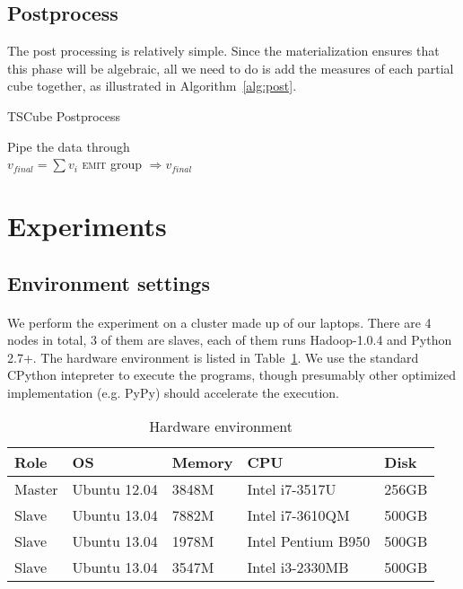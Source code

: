 \documentclass{article}
\begin{document}
\subsection{Postprocess}

The post processing is relatively simple. Since the materialization ensures that this phase will be algebraic, all we need to do is add the measures of each partial cube together, as illustrated in Algorithm~\ref{alg:post}.

\begin{algorithm}[h]
\centering
\caption{TSCube Postprocess}
\label{alg:post}
  \begin{algorithmic}[1]
      \State Pipe the data through
    \EndFunction
\\
      \State $v_{final} = \sum{v_{i}}$
      \State \textsc{emit} group $\Rightarrow v_{final}$
    \EndFunction
  \end{algorithmic}
\end{algorithm}

\section{Experiments}

\subsection{Environment settings}

\paragraph{}
We perform the experiment on a cluster made up of our laptops. There are 4 nodes in total, 3 of them are slaves, each of them runs Hadoop-1.0.4 and Python 2.7+. The hardware environment is listed in Table~\ref{table:env}. We use the standard CPython intepreter to execute the programs, though presumably other optimized implementation (e.g. PyPy) should accelerate the execution.

\begin{table}[h]
\centering
\begin{tabular}{l l l l l}
Role & OS & Memory & CPU & Disk \\
\hline
Master & Ubuntu 12.04 & 3848M & Intel i7-3517U & 256GB \\
Slave & Ubuntu 13.04  & 7882M & Intel i7-3610QM & 500GB \\
Slave & Ubuntu 13.04 & 1978M & Intel Pentium B950 & 500GB \\
Slave & Ubuntu 13.04 & 3547M & Intel i3-2330MB & 500GB
\end{tabular}

\caption{Hardware environment}
\label{table:env}
\end{table}
\end{document}
